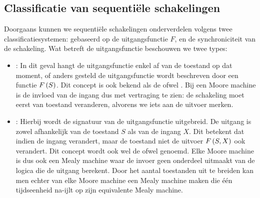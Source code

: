 \subsection{Classificatie van sequenti\"ele schakelingen}
Doorgaans kunnen we sequenti\"ele schakelingen onderverdelen volgens twee classificatiesystemen: gebaseerd op de uitgangsfunctie $F$, en de synchroniciteit van de schakeling. Wat betreft de uitgangsfunctie beschouwen we twee types:
\begin{itemize}
 \item {}: In dit geval hangt de uitgangsfunctie enkel af van de toestand op dat moment, of anders gesteld de uitgangsfunctie wordt beschreven door een functie $F\left( S \right)$. Dit concept is ook bekend als de  ofwel . Bij een Moore machine is de invloed van de ingang dus met vertraging te zien: de schakeling moet eerst van toestand veranderen, alvorens we iets aan de uitvoer merken.
 \item {}: Hierbij wordt de signatuur van de uitgangsfunctie uitgebreid. De uitgang is zowel afhankelijk van de toestand $S$ als van de ingang $X$. Dit betekent dat indien de ingang verandert, maar de toestand niet de uitvoer $F\left( S,X \right)$ ook verandert. Dit concept wordt ook wel de  ofwel  genoemd. Elke Moore machine is dus ook een Mealy machine waar de invoer geen onderdeel uitmaakt van de logica die de uitgang berekent. Door het aantal toestanden uit te breiden kan men echter van elke Moore machine een Mealy machine maken die \'e\'en tijdseenheid na-ijlt op zijn equivalente Mealy machine.
\end{itemize}
